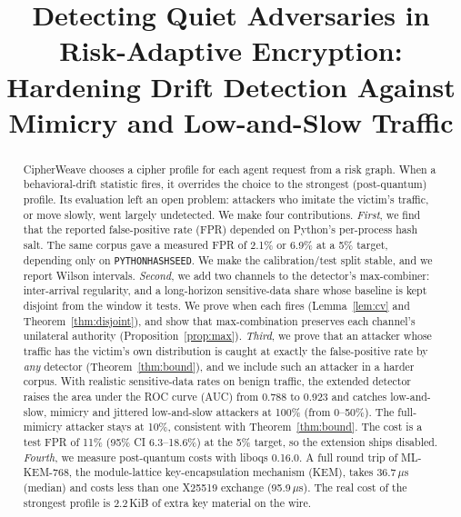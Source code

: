 \documentclass[conference]{IEEEtran}
\theoremstyle{remark}
\begin{document}
\title{Detecting Quiet Adversaries in Risk-Adaptive Encryption:\\ Hardening Drift Detection Against Mimicry and Low-and-Slow Traffic}

\author{
}

\maketitle

\begin{abstract}
CipherWeave chooses a cipher profile for each agent request from a risk graph. When a behavioral-drift statistic fires, it overrides the choice to the strongest (post-quantum) profile. Its evaluation left an open problem: attackers who imitate the victim's traffic, or move slowly, went largely undetected. We make four contributions. \emph{First}, we find that the reported false-positive rate (FPR) depended on Python's per-process hash salt. The same corpus gave a measured FPR of 2.1\% or 6.9\% at a 5\% target, depending only on \texttt{PYTHONHASHSEED}. We make the calibration/test split stable, and we report Wilson intervals. \emph{Second}, we add two channels to the detector's max-combiner: inter-arrival regularity, and a long-horizon sensitive-data share whose baseline is kept disjoint from the window it tests. We prove when each fires (Lemma~\ref{lem:cv} and Theorem~\ref{thm:disjoint}), and show that max-combination preserves each channel's unilateral authority (Proposition~\ref{prop:max}). \emph{Third}, we prove that an attacker whose traffic has the victim's own distribution is caught at exactly the false-positive rate by \emph{any} detector (Theorem~\ref{thm:bound}), and we include such an attacker in a harder corpus. With realistic sensitive-data rates on benign traffic, the extended detector raises the area under the ROC curve (AUC) from 0.788 to 0.923 and catches low-and-slow, mimicry and jittered low-and-slow attackers at 100\% (from 0--50\%). The full-mimicry attacker stays at 10\%, consistent with Theorem~\ref{thm:bound}. The cost is a test FPR of 11\% (95\% CI 6.3--18.6\%) at the 5\% target, so the extension ships disabled. \emph{Fourth}, we measure post-quantum costs with liboqs 0.16.0. A full round trip of ML-KEM-768, the module-lattice key-encapsulation mechanism (KEM), takes 36.7\,$\mu$s (median) and costs less than one X25519 exchange (95.9\,$\mu$s). The real cost of the strongest profile is 2.2\,KiB of extra key material on the wire.
\end{abstract}
\end{document}
